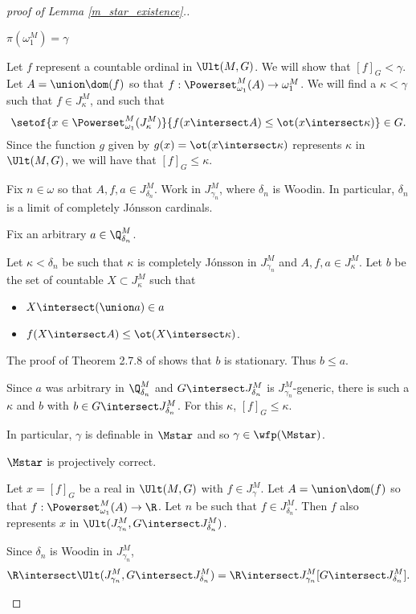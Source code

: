\documentclass[oneside,12pt]{amsart}
\begin{document}
\begin{proof}[proof of Lemma \ref{m_star_existence}.]
\begin{claim}[Claim 1]
$\pi(\omega_1^M)=\gamma$
\end{claim}
\begin{subproof}
Let $f$ represent a countable ordinal in $\Ult(M,G)$. We will show that $[f]_G < \gamma$. Let $A=\union\dom(f)$ so that
$f:\Powerset_{\omega_1}^M(A)\to\omega_1^M$. We will find a $\kappa < \gamma$ such that
$f\in J^M_{\kappa}$, and such that
$$\setof{x\in\Powerset_{\omega_1}^M(J^M_{\kappa})}{f(x\intersect A)\leq \ot(x\intersect \kappa)}\in G.$$
Since the function $g$ given by $g(x)=\ot(x\intersect \kappa)$ represents $\kappa$ in $\Ult(M,G)$,
we will have that $[f]_G \leq \kappa$.

Fix $n\in\omega$ so that $A,f,a\in J^M_{\delta_n}$. Work in $J^M_{\gamma_n}$, where $\delta_n$ is Woodin.
In particular, $\delta_n$ is a limit of completely J\'{o}nsson cardinals.

Fix an arbitrary $a\in \Q^M_{\delta_n}$.


Let $\kappa<\delta_n$ be such
that $\kappa$ is completely J\'{o}nsson in $J^M_{\gamma_n}$ and $A,f,a\in J^M_{\kappa}$. Let $b$ be the set of
countable $X\subset J^M_{\kappa}$ such that
\begin{itemize}
\item $X\intersect (\union a) \in a$
\item $f(X\intersect A) \leq \ot(X\intersect \kappa)$.
\end{itemize}
The proof of Theorem 2.7.8 of \cite{Larson_Book} shows that $b$ is stationary.
Thus $b\leq a$.

Since $a$ was arbitrary in $\Q^M_{\delta_n}$ and $G\intersect J^M_{\delta_n}$ is $J^M_{\gamma_n}$-generic,
there is such a $\kappa$ and $b$ with $b\in G\intersect J^M_{\delta_n}$. For this
$\kappa$, $[f]_G \leq \kappa$.
\end{subproof}


In particular, $\gamma$ is definable in $\Mstar$ and so $\gamma\in\wfp(\Mstar)$.

\begin{claim}[Claim 2]
$\Mstar$ is projectively correct.
\end{claim}
\begin{subproof}
Let $x=[f]_G$ be a real in $\Ult(M,G)$ with $f\in J^M_{\gamma}$.
 Let $A=\union\dom(f)$ so that
$f:\Powerset_{\omega_1}^M(A)\to\R$. Let $n$ be such that $f\in J^M_{\delta_n}$.
Then $f$ also represents $x$ in
$\Ult(J^M_{\gamma_n},G\intersect J^M_{\delta_n})$.

Since $\delta_n$ is Woodin in $J^M_{\gamma_n}$,
$$\R\intersect\Ult(J^M_{\gamma_n},G\intersect J^M_{\delta_n}) = \R\intersect J^M_{\gamma_n}[G\intersect J^M_{\delta_n}].$$


\end{subproof}
\end{proof}
\end{document}
